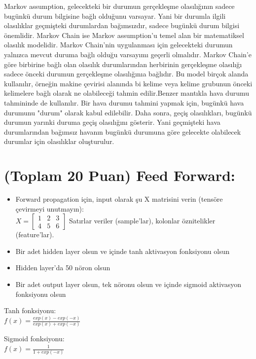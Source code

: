 \documentclass[11pt]{article}
\begin{document}
Markov assumption, gelecekteki bir durumun gerçekleşme olasılığının  sadece bugünkü durum bilgisine bağlı olduğunu varsayar. Yani bir durumla ilgili olasılıklar geçmişteki durumlardan bağımsızdır, sadece bugünkü durum bilgisi önemlidir. Markov Chain ise Markov assumption'u temel alan bir matematiksel olasılık modelidir. Markov Chain'nin uygulanması için gelecekteki durumun yalnızca mevcut duruma bağlı olduğu varsayımı geçerli olmalıdır. Markov Chain'e göre birbirine bağlı olan olasılık durumlarından herbirinin gerçekleşme olasılığı sadece önceki durumun gerçekleşme olasılığınıa bağlıdır. Bu model birçok alanda kullanılır, örneğin makine çevirisi alanında bi kelime veya kelime grubunun önceki kelimelere bağlı olarak ne olabileceği tahmin edilir.Benzer mantıkla hava durumu tahmininde de kullanılır. Bir hava durumu tahmini yapmak için, bugünkü hava durumunu "durum" olarak kabul edilebilir. Daha sonra, geçiş olasılıkları, bugünkü durumun yarınki duruma geçiş olasılığını gösterir. Yani geçmişteki hava durumlarından bağımsız havanın bugünkü durumuna göre gelecekte olabilecek durumlar için olasılıklar oluşturulur.

\section{(Toplam 20 Puan) Feed Forward:}
 
\begin{itemize}
    \item Forward propagation için, input olarak şu X matrisini verin (tensöre çevirmeyi unutmayın):\\
    $X = \begin{bmatrix}
        1 & 2 & 3\\
        4 & 5 & 6
        \end{bmatrix}$
    Satırlar veriler (sample'lar), kolonlar öznitelikler (feature'lar).
    \item Bir adet hidden layer olsun ve içinde tanh aktivasyon fonksiyonu olsun
    \item Hidden layer'da 50 nöron olsun
    \item Bir adet output layer olsun, tek nöronu olsun ve içinde sigmoid aktivasyon fonksiyonu olsun
\end{itemize}

Tanh fonksiyonu:\\
$f(x) = \frac{exp(x) - exp(-x)}{exp(x) + exp(-x)}$
\vspace{.2in}

Sigmoid fonksiyonu:\\
$f(x) = \frac{1}{1 + exp(-x)}$
\end{document}
